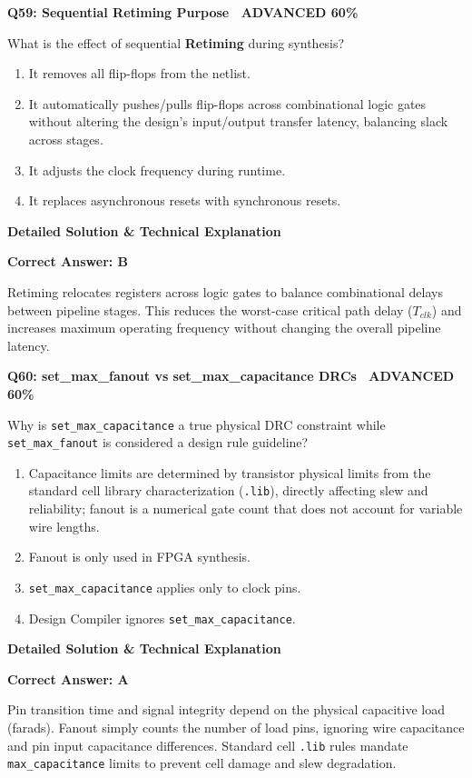 \documentclass[11pt,a4paper]{article}
\newcommand{\badgeadv}{{\color{white}\colorbox{advred}{\bfseries\sffamily\tiny\ ADVANCED 60\%\ }}}
\newenvironment{qbox}[2]{%
  \begin{mdframed}[style=qstyle]%
  {\bfseries\sffamily\color{primaryblue}#1 \hfill #2}\par\vspace{2pt}%
}{%
  \end{mdframed}%
}
\newenvironment{ansbox}{%
  \begin{mdframed}[style=ansstyle]%
  {\bfseries\sffamily\color{ansgreen}\small Detailed Solution \& Technical Explanation}\par\vspace{2pt}\small%
}{%
  \end{mdframed}%
}
\begin{document}
\begin{qbox}{Q59: Sequential Retiming Purpose}{\badgeadv}
What is the effect of sequential \textbf{Retiming} during synthesis?
\begin{enumerate}[label=\textbf{\Alph*.}]
  \item It removes all flip-flops from the netlist.
  \item It automatically pushes/pulls flip-flops across combinational logic gates without altering the design's input/output transfer latency, balancing slack across stages.
  \item It adjusts the clock frequency during runtime.
  \item It replaces asynchronous resets with synchronous resets.
\end{enumerate}
\end{qbox}
\begin{ansbox}
\textbf{Correct Answer: B}

Retiming relocates registers across logic gates to balance combinational delays between pipeline stages. This reduces the worst-case critical path delay ($T_{clk}$) and increases maximum operating frequency without changing the overall pipeline latency.
\end{ansbox}

\begin{qbox}{Q60: set\_max\_fanout vs set\_max\_capacitance DRCs}{\badgeadv}
Why is \texttt{set\_max\_capacitance} a true physical DRC constraint while \texttt{set\_max\_fanout} is considered a design rule guideline?
\begin{enumerate}[label=\textbf{\Alph*.}]
  \item Capacitance limits are determined by transistor physical limits from the standard cell library characterization (\texttt{.lib}), directly affecting slew and reliability; fanout is a numerical gate count that does not account for variable wire lengths.
  \item Fanout is only used in FPGA synthesis.
  \item \texttt{set\_max\_capacitance} applies only to clock pins.
  \item Design Compiler ignores \texttt{set\_max\_capacitance}.
\end{enumerate}
\end{qbox}
\begin{ansbox}
\textbf{Correct Answer: A}

Pin transition time and signal integrity depend on the physical capacitive load (farads). Fanout simply counts the number of load pins, ignoring wire capacitance and pin input capacitance differences. Standard cell \texttt{.lib} rules mandate \texttt{max\_capacitance} limits to prevent cell damage and slew degradation.
\end{ansbox}
\end{document}
